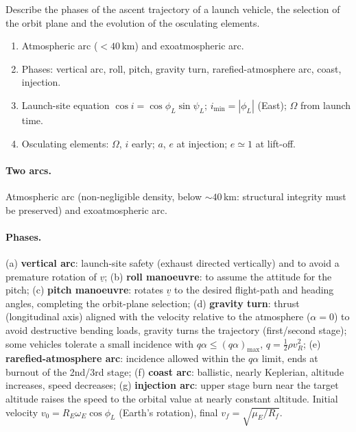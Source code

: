 \begin{qbox}
Describe the phases of the ascent trajectory of a launch vehicle, the selection of the orbit plane and the evolution of the osculating elements.
\end{qbox}
\begin{outline}
\begin{enumerate}
\item Atmospheric arc ($<40$\,km) and exoatmospheric arc.
\item Phases: vertical arc, roll, pitch, gravity turn, rarefied-atmosphere arc, coast, injection.
\item Launch-site equation $\cos i=\cos\phi_L\sin\psi_L$; $i_{\min}=|\phi_L|$ (East); $\Omega$ from launch time.
\item Osculating elements: $\Omega$, $i$ early; $a$, $e$ at injection; $e\simeq1$ at lift-off.
\end{enumerate}
\end{outline}
\answer
\paragraph{Two arcs.} Atmospheric arc (non-negligible density, below $\sim40$\,km: structural integrity must be preserved) and exoatmospheric arc.
\paragraph{Phases.}
(a) \textbf{vertical arc}: launch-site safety (exhaust directed vertically) and to avoid a premature rotation of $\underline v$; (b) \textbf{roll manoeuvre}: to assume
the attitude for the pitch; (c) \textbf{pitch manoeuvre}: rotates $\underline v$ to the desired flight-path and heading angles, completing the orbit-plane
selection; (d) \textbf{gravity turn}: thrust (longitudinal axis) aligned with the velocity relative to the atmosphere ($\alpha=0$) to avoid destructive bending
loads, gravity turns the trajectory (first/second stage); some vehicles tolerate a small incidence with $q\alpha\le(q\alpha)_{\max}$, $q=\frac12\rho v_R^2$;
(e) \textbf{rarefied-atmosphere arc}: incidence allowed within the $q\alpha$ limit, ends at burnout of the 2nd/3rd stage; (f) \textbf{coast arc}: ballistic,
nearly Keplerian, altitude increases, speed decreases; (g) \textbf{injection arc}: upper stage burn near the target altitude raises the speed to the orbital
value at nearly constant altitude. Initial velocity $v_0=R_E\omega_E\cos\phi_L$ (Earth's rotation), final $v_f=\sqrt{\mu_E/R_f}$.
